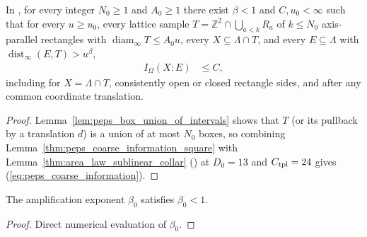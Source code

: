 \begin{lemma}
    \label{thm:peps_coarse_information}
    \leanok
    In \cite[Proposition~3.1]{OpenAI2026PolynomialPEPS}, for every integer
    $N_0\ge1$ and $A_0\ge1$ there exist $\beta<1$ and $C,u_0<\infty$ such that for every $u\ge u_0$, every lattice sample $T=\mathbb Z^2\cap\bigcup_{a<k}R_a$ of $k\le N_0$ axis-parallel rectangles with $\operatorname{diam}_\infty T\le A_0u$, every $X\subseteq\Lambda\cap T$, and every $E\subseteq\Lambda$ with $\operatorname{dist}_\infty(E,T)>u^\beta$,
    \begin{align}
        I_\Omega(X:E) & \le C,
        \label{eq:peps_coarse_information}
    \end{align}
    including for $X=\Lambda\cap T$, consistently open or closed rectangle sides, and after any common coordinate translation.
\end{lemma}
\begin{proof}
    \leanok
    Lemma~\ref{lem:peps_box_union_of_intervals} shows that $T$ (or its pullback by a translation $d$) is a union of at most $N_0$ boxes, so combining Lemma~\ref{thm:peps_coarse_information_square} with Lemma~\ref{thm:area_law_sublinear_collar} (\cite[Proposition~9.6]{OpenAI2026AreaLaw}) at $D_0=13$ and $C_{\rm tpl}=24$ gives (\ref{eq:peps_coarse_information}).
\end{proof}

\begin{lemma}
    \label{lem:peps_coarse_exponent_lt_one}
    \leanok
    The amplification exponent $\beta_0$ satisfies $\beta_0<1$.
\end{lemma}

\begin{proof}
    \leanok
    Direct numerical evaluation of $\beta_0$.
\end{proof}

